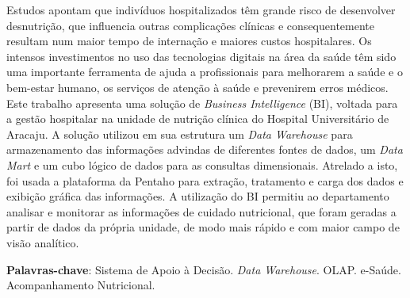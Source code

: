 \setlength{\absparsep}{18pt} %
\begin{resumo}
 
Estudos apontam que indivíduos hospitalizados têm grande risco de desenvolver desnutrição, que influencia outras complicações clínicas e consequentemente resultam num maior tempo de internação e maiores custos hospitalares. Os intensos investimentos no uso das tecnologias digitais na área da saúde têm sido uma importante ferramenta de ajuda a profissionais para melhorarem a saúde e o bem-estar humano, os serviços de atenção à saúde e prevenirem erros médicos. Este trabalho apresenta uma solução de \textit{Business Intelligence} (BI), voltada para a gestão hospitalar na unidade de nutrição clínica do Hospital Universitário de Aracaju. A solução utilizou em sua estrutura um \textit{Data Warehouse} para armazenamento das informações advindas de diferentes fontes de dados, um \textit{Data Mart} e um cubo lógico de dados para as consultas dimensionais. Atrelado a isto, foi usada a plataforma da Pentaho para extração, tratamento e carga dos dados e exibição gráfica das informações. A utilização do BI permitiu ao departamento analisar e monitorar as informações de cuidado nutricional, que foram geradas a partir de dados da própria unidade, de modo mais rápido e com maior campo de visão analítico. 

 \textbf{Palavras-chave}: Sistema de Apoio à Decisão. \textit{Data Warehouse}. OLAP. e-Saúde. Acompanhamento Nutricional.
\end{resumo}
